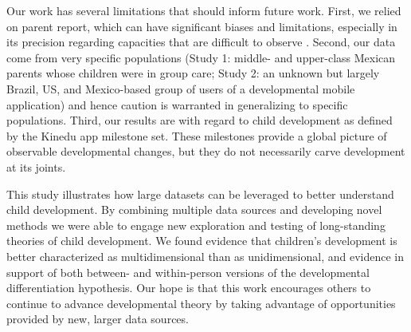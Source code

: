 \documentclass[man, floatsintext]{apa7}
\begin{document}
Our work has several limitations that should inform future work. First,
we relied on parent report, which can have significant biases and
limitations, especially in its precision regarding capacities that are
difficult to observe \parencite[e.g., cognitive abilities;][]{frank2021,feldman2000}. Second, our
data come from very specific populations (Study 1: middle- and
upper-class Mexican parents whose children were in group care; Study 2:
an unknown but largely Brazil, US, and Mexico-based group of users of a developmental mobile application) and hence
caution is warranted in generalizing to specific populations. Third, our results are with regard to child development
as deﬁned by the Kinedu app milestone set. These milestones provide a global picture of observable developmental changes, but they do not necessarily carve development at its joints.

This study illustrates how
large datasets can be leveraged to better understand child development. By
combining multiple data sources and developing novel methods we
were able to engage new exploration and testing of long-standing theories of child development. We found evidence that children's development is better characterized as multidimensional than as unidimensional, and evidence in support of both between- and within-person versions of the
developmental differentiation hypothesis. Our hope is
that this work encourages others to continue to advance developmental
theory by taking advantage of opportunities provided by new,
larger data sources.

\printbibliography
\end{document}
